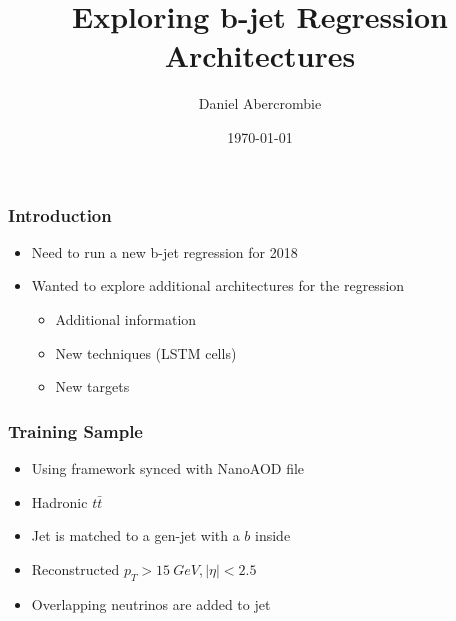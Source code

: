 \documentclass{beamer}
\author[D. Abercrombie]{
  Daniel Abercrombie
}
\title{\bf \sffamily Exploring b-jet Regression Architectures}
\date{\today}
\begin{document}
\begin{frame}
  \titlepage
\end{frame}

\begin{frame}
  \frametitle{Introduction}

  \begin{itemize}
  \item Need to run a new b-jet regression for 2018
  \item Wanted to explore additional architectures for the regression
    \begin{itemize}
    \item Additional information
    \item New techniques (LSTM cells)
    \item New targets
    \end{itemize}
  \end{itemize}

\end{frame}

\begin{frame}
  \frametitle{Training Sample}

  \begin{itemize}
  \item Using framework synced with NanoAOD file
  \item Hadronic $t\bar{t}$
  \item Jet is matched to a gen-jet with a $b$ inside
  \item Reconstructed $p_T > \SI{15}{GeV}, |\eta| < 2.5$
  \item Overlapping neutrinos are added to jet
  \end{itemize}

\end{frame}
\end{document}
